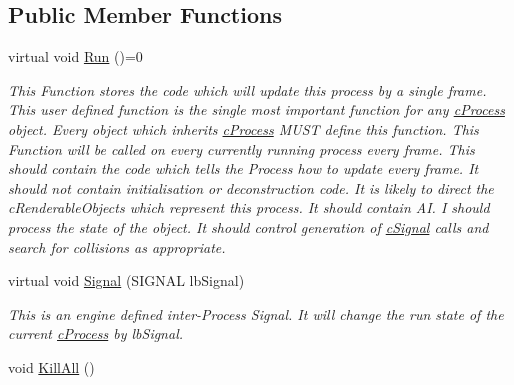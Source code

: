 \subsection*{Public Member Functions}
\begin{DoxyCompactItemize}
\item 
\hypertarget{classc_process_a3e0fab4ccc0a8fb065d50eb88b6a0dd5}{
virtual void \hyperlink{classc_process_a3e0fab4ccc0a8fb065d50eb88b6a0dd5}{Run} ()=0}
\label{classc_process_a3e0fab4ccc0a8fb065d50eb88b6a0dd5}

\begin{DoxyCompactList}\small\item\em This Function stores the code which will update this process by a single frame. This user defined function is the single most important function for any \hyperlink{classc_process}{cProcess} object. Every object which inherits \hyperlink{classc_process}{cProcess} MUST define this function. This Function will be called on every currently running process every frame. This should contain the code which tells the Process how to update every frame. It should not contain initialisation or deconstruction code. It is likely to direct the cRenderableObjects which represent this process. It should contain AI. I should process the state of the object. It should control generation of \hyperlink{classc_signal}{cSignal} calls and search for collisions as appropriate. \end{DoxyCompactList}\item 
virtual void \hyperlink{classc_process_a866c2958baab074f14015c04d263ba6f}{Signal} (SIGNAL lbSignal)
\begin{DoxyCompactList}\small\item\em This is an engine defined inter-\/Process Signal. It will change the run state of the current \hyperlink{classc_process}{cProcess} by lbSignal. \end{DoxyCompactList}\item 
\hypertarget{classc_process_a7790410ef974a65c7227b83f3d0cd709}{
void \hyperlink{classc_process_a7790410ef974a65c7227b83f3d0cd709}{KillAll} ()}
\label{classc_process_a7790410ef974a65c7227b83f3d0cd709}


\end{DoxyCompactItemize}
